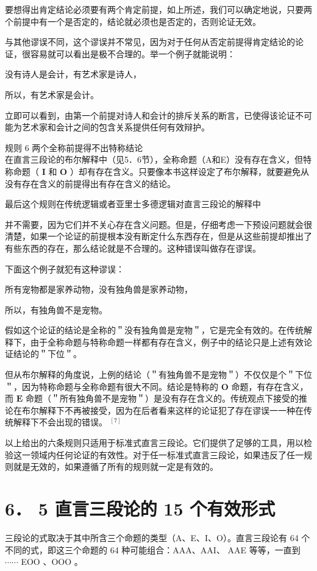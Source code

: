 要想得出肯定结论必须要有两个肯定前提，如上所述，我们可以确定地说，只要两个前提中有一个是否定的，结论就必须也是否定的，否则论证无效。

与其他谬误不同，这个谬误并不常见，因为对于任何从否定前提得肯定结论的论证，很容易就可以看出是极不合理的。举一个例子就能说明：

\begin{displayquote}
没有诗人是会计，有艺术家是诗人，
\end{displayquote}

所以，有艺术家是会计。

立即可以看到，由第一个前提对诗人和会计的排斥关系的断言，已使得该论证不可能为艺术家和会计之间的包含关系提供任何有效辩护。

规则 6 两个全称前提得不出特称结论\\
在直言三段论的布尔解释中（见5．6节），全称命题（A和E）没有存在含义，但特称命题（ $\mathbf{I}$ 和 $\mathbf{O}$ ）却有存在含义。只要像本书这样设定了布尔解释，就要避免从没有存在含义的前提得出有存在含义的结论。

最后这个规则在传统逻辑或者亚里士多德逻辑对直言三段论的解释中

并不需要，因为它们并不关心存在含义问题。但是，仔细考虑一下预设问题就会很清楚，如果一个论证的前提根本没有断定什么东西存在，但是从这些前提却推出了有些东西的存在，那么结论就是不合理的。这种错误叫做存在谬误。

下面这个例子就犯有这种谬误：

所有宠物都是家养动物，没有独角兽是家养动物，

所以，有独角兽不是宠物。

假如这个论证的结论是全称的＂没有独角兽是宠物＂，它是完全有效的。在传统解释下，由于全称命题与特称命题一样都有存在含义，例子中的结论只是上述有效论证结论的＂下位＂。

但从布尔解释的角度说，上例的结论（＂有独角兽不是宠物＂）不仅仅是个＂下位＂，因为特称命题与全称命题有很大不同。结论是特称的 $\mathbf{O}$ 命题，有存在含义，而 $\mathbf{E}$ 命题（＂所有独角兽不是宠物＂）是没有存在含义的。传统观点下接受的推论在布尔解释下不再被接受，因为在后者看来这样的论证犯了存在谬误一一种在传统解释下不会出现的错误。 ${ }^{[7]}$

以上给出的六条规则只适用于标准式直言三段论。它们提供了足够的工具，用以检验这一领域内任何论证的有效性。对于任一标准式直言三段论，如果违反了任一规则就是无效的，如果遵循了所有的规则就一定是有效的。

\section*{6． 5 直言三段论的 15 个有效形式}
三段论的式取决于其中所含三个命题的类型（A、E、I、O）。直言三段论有 64 个不同的式，即这三个命题的 64 种可能组合：AAA、AAI、 AAE 等等，一直到 $\cdots \cdots$ EOO $、 \mathrm{OOO}$ 。

